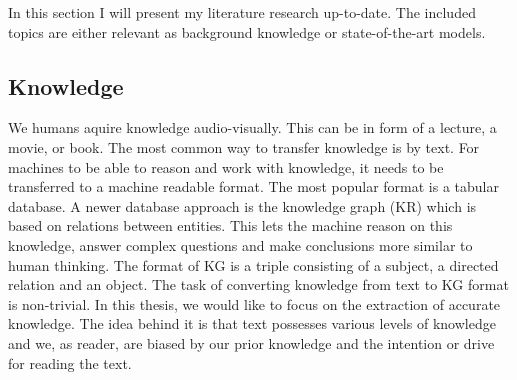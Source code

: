 In this section I will present my literature research up-to-date. The included topics are either relevant as background knowledge or state-of-the-art models.



\subsection{Knowledge}

We humans aquire knowledge audio-visually. This can be in form of a lecture, a movie, or book. The most common way to transfer knowledge is by text. For machines to be able to reason and work with knowledge, it needs to be transferred to a machine readable format. The most popular format is a tabular database. A newer database approach is the knowledge graph (KR) which is based on relations between entities. This lets the machine reason on this knowledge, answer complex questions and make conclusions more similar to human thinking.
The format of KG is a triple consisting of a subject, a directed relation and an object.
The task of converting knowledge from text to KG format is non-trivial. In this thesis, we would like to focus on the extraction of accurate knowledge. The idea behind it is that text possesses various levels of knowledge and we, as reader, are biased by our prior knowledge and the intention or drive for reading the text. 

